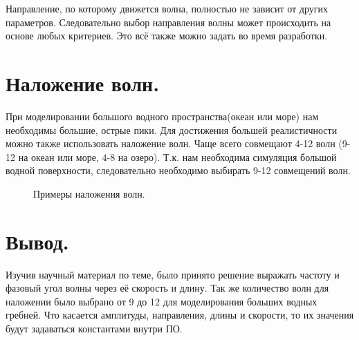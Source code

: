Направление, по которому движется волна, полностью не зависит от других параметров. Следовательно выбор направления волны может происходить на основе любых критериев. Это всё также можно задать во время разработки.

\newpage
\section{Наложение волн.}

При моделировании большого водного пространства(океан или море) нам необходимы большие, острые пики. Для достижения большей реалистичности можно также использовать наложение волн. Чаще всего совмещают 4-12 волн (9-12 на океан или море, 4-8 на озеро). Т.к. нам необходима симуляция большой водной поверхности, следовательно необходимо выбирать 9-12 совмещений волн.

\begin{figure}[h]
	\caption{Примеры наложения волн.}
\end{figure}

\newpage
\section*{Вывод.}

Изучив научный материал по теме, было принято решение выражать частоту и фазовый угол волны через её скорость и длину. Так же количество волн для наложении было выбрано от 9 до 12 для моделирования больших водных гребней. Что касается амплитуды, направления, длины и скорости, то их значения будут задаваться константами внутри ПО. 
